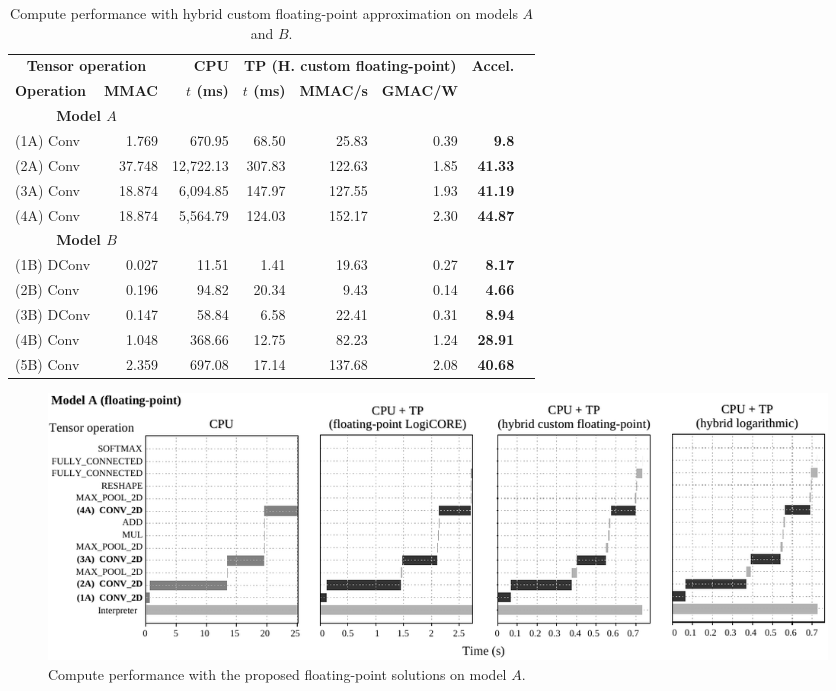 \begin{table}[!htp]\centering
	\caption{Compute performance with hybrid custom floating-point approximation on models $A$ and $B$.}\label{tab:performace_float_hybrid}
	\scriptsize
\begin{tabular}{lrrrrrrr}\toprule
	\multicolumn{2}{c}{\textbf{Tensor operation}} &\textbf{CPU} &\multicolumn{3}{c}{\textbf{TP (H. custom floating-point)}} &\multirow{2}{*}{\textbf{Accel.}} \\\cmidrule{1-6}
	\textbf{Operation} &\textbf{MMAC} &\textbf{$t$ (ms)} &\textbf{$t$ (ms)} &\textbf{MMAC/s} &\textbf{GMAC/W} & \\\midrule
	\multicolumn{2}{c}{\textbf{Model $A$}} & & & & & \\
	(1A) Conv &1.769 &670.95 &68.50 &25.83 &0.39 &\textbf{9.8} \\
	(2A) Conv &37.748 &12,722.13 &307.83 &122.63 &1.85 &\textbf{41.33} \\
	(3A) Conv &18.874 &6,094.85 &147.97 &127.55 &1.93 &\textbf{41.19} \\
	(4A) Conv &18.874 &5,564.79 &124.03 &152.17 &2.30 &\textbf{44.87} & \\\midrule
	\multicolumn{2}{c}{\textbf{Model $B$}} & & & & & \\
	(1B) DConv &0.027 &11.51 &1.41 &19.63 &0.27 &\textbf{8.17} \\
	(2B) Conv &0.196 &94.82 &20.34 &9.43 &0.14 &\textbf{4.66} \\
	(3B) DConv &0.147 &58.84 &6.58 &22.41 &0.31 &\textbf{8.94} \\
	(4B) Conv &1.048 &368.66 &12.75 &82.23 &1.24 &\textbf{28.91} \\
	(5B) Conv &2.359 &697.08 &17.14 &137.68 &2.08 &\textbf{40.68} \\
	\bottomrule
\end{tabular}
\end{table}


\begin{figure}[t!]
	\centering
	\includegraphics[width=\textwidth]{../figures/sched_A_float_all.pdf}
	\caption{Compute performance with the proposed floating-point solutions on model $A$.}
	\label{fig:sched_model_a_float}
\end{figure}


